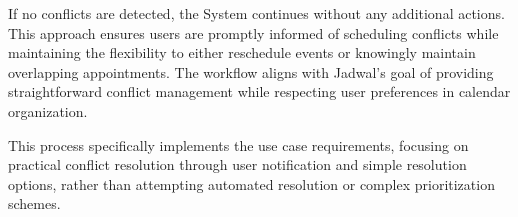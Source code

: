 If no conflicts are detected, the System continues without any additional actions. This approach ensures users are promptly informed of scheduling conflicts while maintaining the flexibility to either reschedule events or knowingly maintain overlapping appointments. The workflow aligns with Jadwal's goal of providing straightforward conflict management while respecting user preferences in calendar organization.

This process specifically implements the use case requirements, focusing on practical conflict resolution through user notification and simple resolution options, rather than attempting automated resolution or complex prioritization schemes.